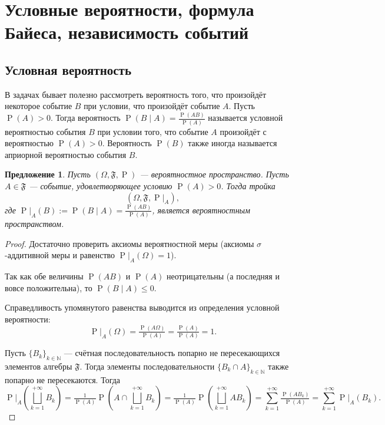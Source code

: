 \documentclass[12pt]{article}
\newtheorem{proposition}[theorem]{Предложение}
\numberwithin{theorem}{section}
\theoremstyle{definition}
\newcommand{\defin}[2]{\hypertarget{#2}{{\color{red} #1}}}
\newcommand{\prob}{\operatorname{P}}
\newcommand{\events}{\mathfrak{F}}
\begin{document}
	\section{Условные вероятности, формула Байеса, независимость событий}
	
	\subsection{Условная вероятность}
	
	В задачах бывает полезно рассмотреть вероятность того, что произойдёт некоторое событие $ B $ при условии, 
	что произойдёт событие $ A $. Пусть $ \prob(A) > 0 $. Тогда вероятность $ \prob(B \mid A) = \tfrac{\prob(AB)}{\prob(A)} $
	называется \defin{условной вероятностью события $ B $ при условии того, 
	что событие $ A $ произойдёт с вероятностью $ \prob(A) > 0 $}{conditional}.
	Вероятность $ \prob(B) $ также иногда называется \defin{априорной вероятностью события $ B $}{apriori}.
		
	\begin{proposition}
		Пусть $ (\Omega, \events, \prob) $ --- вероятностное пространство.
		Пусть $ {A \in \events} $ --- событие, удовлетворяющее условию $ \prob(A) > 0 $.
		Тогда тройка $$ (\Omega, \events, \left.\prob\right|_{A}), $$
		где $ \left.\prob\right|_{A}(B) := \prob(B \mid A) = \tfrac{\prob(AB)}{\prob(A)} $,
		является вероятностным пространством.
	\end{proposition}
	
	\begin{proof}
		Достаточно проверить аксиомы вероятностной меры 
		(аксиомы $ \sigma $-аддитивной меры и равенство $ \left.\prob\right|_{A}(\Omega) = 1 $).
		
		Так как обе величины $ \prob(AB) $ и $ \prob(A) $ неотрицательны (а последняя и вовсе положительна),
		то $ \prob(B \mid A) \leqslant 0 $.
		
		Справедливость упомянутого равенства выводится из определения условной вероятности: 
		$$ \left.\prob\right|_{A}(\Omega) = \tfrac{\prob(A\Omega)}{\prob(A)} = \tfrac{\prob(A)}{\prob(A)} = 1. $$
		
		Пусть $ \{B_k\}_{k \in \mathbb{N}} $ --- 
		счётная последовательность попарно не пересекающихся элементов алгебры $ \events $. 
		Тогда элементы последовательности $ \{B_k \cap A\}_{k \in \mathbb{N}} $ также попарно не пересекаются.
		Тогда
		$$ \left.\prob\right|_{A}\left(\bigsqcup\limits_{k = 1}^{+\infty} B_k \right)
		= \tfrac{1}{\prob(A)}\prob\left(A \cap \bigsqcup\limits_{k = 1}^{+\infty} B_k \right)
		= \tfrac{1}{\prob(A)}\prob\left(\bigsqcup\limits_{k = 1}^{+\infty} AB_k \right)
		= \sum\limits_{k = 1}^{+\infty} \tfrac{\prob(AB_k)}{\prob(A)} 
		= \sum\limits_{k = 1}^{+\infty} \left.\prob\right|_{A}(B_k). $$
	\end{proof}
	
\end{document}
